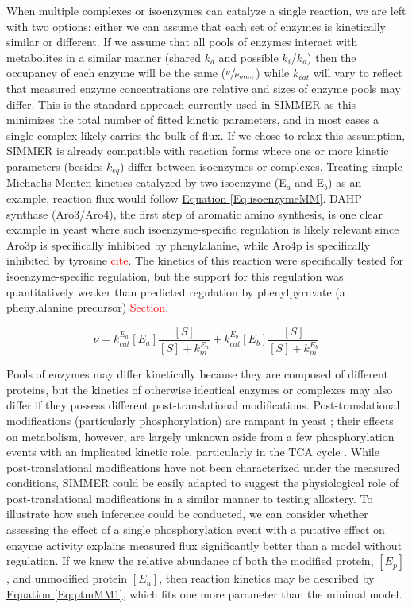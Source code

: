 When multiple complexes or isoenzymes can catalyze a single reaction, we are left with two options; either we can assume that each set of enzymes is kinetically similar or different. If we assume that all pools of enzymes interact with metabolites in a similar manner (shared $k_{d}$ and possible $k_{i}$/$k_{a}$) then the occupancy of each enzyme will be the same ($\sfrac{\nu}{\nu_{max}}$) while $k_{cat}$ will vary to reflect that measured enzyme concentrations are relative and sizes of enzyme pools may differ.  This is the standard approach currently used in SIMMER as this minimizes the total number of fitted kinetic parameters, and in most cases a single complex likely carries the bulk of flux. If we chose to relax this assumption, SIMMER is already  compatible with reaction forms where one or more kinetic parameters (besides $k_{eq}$) differ between isoenzymes or complexes. Treating simple Michaelis-Menten kinetics catalyzed by two isoenzyme (E$_{a}$ and E$_{b}$) as an example, reaction flux would follow \hyperref[Eq:isoenzymeMM]{Equation \ref{Eq:isoenzymeMM}}. DAHP synthase (Aro3/Aro4), the first step of aromatic amino synthesis, is one clear example in yeast where such isoenzyme-specific regulation is likely relevant since Aro3p is specifically inhibited by phenylalanine, while Aro4p is specifically inhibited by tyrosine \textcolor{red}{cite}. The kinetics of this reaction were specifically tested for isoenzyme-specific regulation, but the support for this regulation was quantitatively weaker than predicted regulation by phenylpyruvate (a phenylalanine precursor) \textcolor{red}{Section}. 

\begin{equation}
\nu = k_{cat}^{E_{a}}\left[E_{a}\right]\frac{\left[S\right]}{\left[S\right] + k_{m}^{E_{a}}} + k_{cat}^{E_{b}}\left[E_{b}\right]\frac{\left[S\right]}{\left[S\right] + k_{m}^{E_{b}}}\label{Eq:isoenzymeMM}
\end{equation}

Pools of enzymes may differ kinetically because they are composed of different proteins, but the kinetics of otherwise identical enzymes or complexes may also differ if they possess different post-translational modifications.  Post-translational modifications (particularly phosphorylation) are rampant in yeast \cite{Fiedler:2009hx}; their effects on metabolism, however, are largely unknown aside from a few phosphorylation events with an implicated kinetic role, particularly in the TCA cycle \cite{Schulz:2014eo}. While post-translational modifications have not been characterized under the measured conditions, SIMMER could be easily adapted to suggest the physiological role of post-translational modifications in a similar manner to testing allostery. To illustrate how such inference could be conducted, we can consider whether assessing the effect of a single phosphorylation event with a putative effect on enzyme activity explains measured flux significantly better than a model without regulation. If we knew the relative abundance of both the modified protein, $\left[E_{p}\right]$, and unmodified protein $\left[E_{u}\right]$, then reaction kinetics may be described by \hyperref[Eq:ptmMM1]{Equation \ref{Eq:ptmMM1}}, which fits one more parameter than the minimal model.


